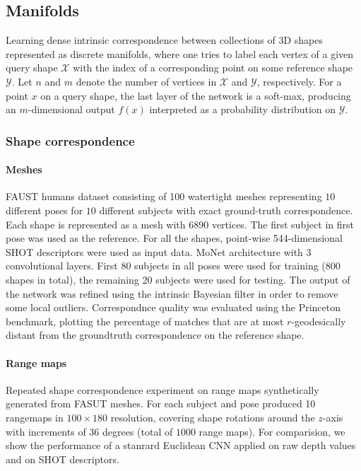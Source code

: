 \documentclass[pdftex,10pt,a4paper]{scrartcl}
\begin{document}
\subsection{Manifolds}

Learning dense intrinsic correspondence between collections of 3D shapes represented as discrete manifolds, where one tries to label each vertex of a given query shape $\mathcal{X}$ with the index of a corresponding point on some reference shape $\mathcal{Y}$.
Let $n$ and $m$ denote the number of vertices in $\mathcal{X}$ and $\mathcal{Y}$, respectively.
For a point $x$ on a query shape, the last layer of the network is a soft-max, producing an $m$-dimensional output $f(x)$ interpreted as a probability distribution on $\mathcal{Y}$.

\subsubsection{Shape correspondence}

\paragraph{Meshes}

FAUST humans dataset consisting of 100 watertight meshes representing $10$ different poses for $10$ different subjects with exact ground-truth correspondence.
Each shape is represented as a mesh with $6890$ vertices.
The first subject in first pose was used as the reference.
For all the shapes, point-wise 544-dimensional SHOT descriptors were used as input data.
MoNet architecture with 3 convolutional layers.
First 80 subjects in all poses were used for training (800 shapes in total), the remaining 20 subjects were used for testing.
The output of the network was refined using the intrinsic Bayesian filter in order to remove some local outliers.
Correspondnce quality was evaluated using the Princeton benchmark, plotting the percentage of matches that are at most $r$-geodesically distant from the groundtruth correspondence on the reference shape.

\paragraph{Range maps}

Repeated shape correspondence experiment on range maps synthetically generated from FASUT meshes.
For each subject and pose produced 10 rangemaps in $100 \times 180$ resolution, covering shape rotations around the $z$-axis with increments of $36$ degrees (total of $1000$ range maps).
For comparision, we show the performance of a stanrard Euclidean CNN applied on raw depth values and on SHOT descriptors.
\end{document}
